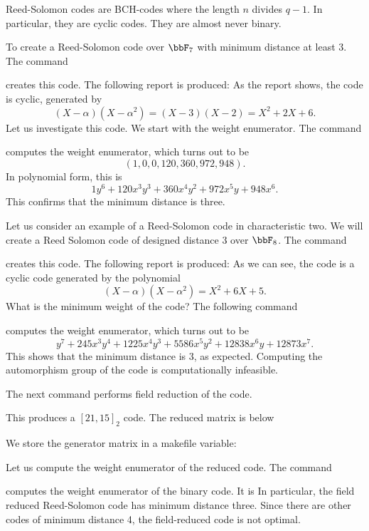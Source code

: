 Reed-Solomon codes are BCH-codes where the length $n$ divides $q-1.$
In particular, they are cyclic codes. 
They are almost never binary.

\bigskip

To create a Reed-Solomon code over $\bbF_7$ 
with minimum distance at least $3.$
The command 


creates this code.
The following report is produced:
As the report shows, the code is cyclic, generated by 
$$
(X-\alpha)(X-\alpha^2) = (X-3)(X-2)= X^2+2X+6.
$$
Let us investigate this code. 
We start with the weight enumerator. 
The command 


computes the weight enumerator, which turns out to be
$$
( 1, 0, 0, 120, 360, 972, 948 ).
$$
In polynomial form, this is
$$
1y^6 + 120x^3y^3 + 360x^4y^2 + 972x^5y + 948x^6.
$$
This confirms that the minimum distance is three.

\bigskip

Let us consider an example of a 
Reed-Solomon code in characteristic two.
We will create a Reed Solomon code of designed distance 3 over $\bbF_8$.
The command 


creates this code.
The following report is produced:
As we can see, the code is a cyclic code generated by the polynomial 
$$
(X-\alpha)(X-\alpha^2) = X^2+6X+5.
$$
What is the minimum weight of the code?
The following command 


computes the weight enumerator,
which turns out to be 
$$
y^7 + 245x^3y^4 + 1225x^4y^3 + 5586x^5y^2 + 12838x^6y + 12873x^7.
$$
This shows that the minimum distance is 3, as expected.
Computing the automorphism group of the code is computationally infeasible.

\bigskip


The next command performs field reduction of the code. 



This produces a $[21,15]_2$ code.
The reduced matrix is below

We store the generator matrix in a makefile variable:


Let us compute the weight enumerator of the reduced code.
The command 


computes the weight enumerator of the binary code. It is
In particular, 
the field reduced Reed-Solomon code has minimum distance three. 
Since there are other 
codes of minimum distance 4, the field-reduced code is not optimal.


